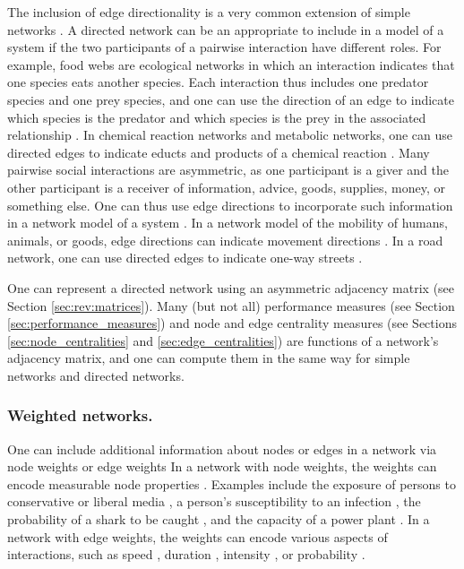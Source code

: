 \documentclass{comnet-mod}
\begin{document}
The inclusion of edge directionality is a very common extension of simple networks \cite{Newman2018}. A directed network can be an appropriate to include in a model of a system if the two participants of a pairwise interaction have different roles. For example, food webs are ecological networks in which an interaction indicates that one species eats another species. Each interaction thus includes one predator species and one prey species, and one can use the direction of an edge to indicate which species is the predator and which species is the prey in the associated relationship \cite{Dunne2002, Dunne2004}. In chemical reaction networks and metabolic networks, one can use directed edges to indicate educts and products of a chemical reaction \cite{Larhlimi2011, Winterbach2011, Takemoto2012}. Many pairwise social interactions are asymmetric, as one participant is a giver and the other participant is a receiver of information, advice, goods, supplies, money, or something else. One can thus use edge directions to incorporate such information in a network model of a system \cite{Cross2001, Caudell2015, Zheng2015, Baggio2016}. In a network model of the mobility of humans, animals, or goods, edge directions can indicate movement directions \cite{Nair2011, Tang2016, Sun2017}. In a road network, one can use directed edges to indicate one-way streets \cite{Feng2009}. 

One can represent a directed network using an asymmetric adjacency matrix (see Section \ref{sec:rev:matrices}). Many (but not all) performance measures (see Section \ref{sec:performance_measures}) and node and edge centrality measures (see Sections \ref{sec:node_centralities} and \ref{sec:edge_centralities}) are functions of a network's adjacency matrix, and one can compute them in the same way for simple networks and directed networks.


\subsubsection{Weighted networks.}

One can include additional information about nodes or edges in a network via node weights or edge weights
In a network with node weights, the weights can encode measurable node properties \cite{Antoniou2008, Phillips2012, Gou2017, Mourier2017, Matakos2020}. Examples include the exposure of persons to conservative or liberal media \cite{Matakos2020}, a person's susceptibility to an infection \cite{Gou2017}, the probability of a shark to be caught \cite{Mourier2017}, and the capacity of a power plant \cite{Phillips2012}. In a network with edge weights, the weights can encode various aspects of interactions, such as speed \cite{Li2015a}, duration \cite{Akoglu2012}, intensity \cite{Freire2011}, or probability \cite{Raimondo2021}.
\end{document}
